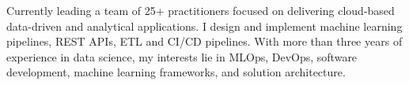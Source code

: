 

\begin{cvparagraph}

Currently leading a team of 25+ practitioners focused on delivering cloud-based data-driven and analytical applications. I design and implement machine learning pipelines, REST APIs, ETL and CI/CD pipelines. With more than three years of experience in data science, my interests lie in MLOps, DevOps, software development, machine learning frameworks, and solution architecture.
\end{cvparagraph}
